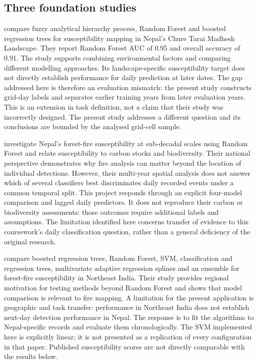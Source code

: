 \documentclass[conference,a4paper]{IEEEtran}
\begin{document}
\subsection{Three foundation studies}
\citet{dhakal} compare fuzzy analytical hierarchy process, Random Forest and boosted regression trees for susceptibility mapping in Nepal's Chure Tarai Madhesh Landscape. They report Random Forest AUC of 0.95 and overall accuracy of 0.91. The study supports combining environmental factors and comparing different modelling approaches. Its landscape-specific susceptibility target does not directly establish performance for daily prediction at later dates. The gap addressed here is therefore an evaluation mismatch: the present study constructs grid-day labels and separates earlier training years from later evaluation years. This is an extension in task definition, not a claim that their study was incorrectly designed. The present study addresses a different question and its conclusions are bounded by the analysed grid-cell sample.

\citet{dahal} investigate Nepal's forest-fire susceptibility at sub-decadal scales using Random Forest and relate susceptibility to carbon stocks and biodiversity. Their national perspective demonstrates why fire analysis can matter beyond the location of individual detections. However, their multi-year spatial analysis does not answer which of several classifiers best discriminates daily recorded events under a common temporal split. This project responds through an explicit four-model comparison and lagged daily predictors. It does not reproduce their carbon or biodiversity assessments: those outcomes require additional labels and assumptions. The limitation identified here concerns transfer of evidence to this coursework's daily classification question, rather than a general deficiency of the original research.

\citet{sarkar} compare boosted regression trees, Random Forest, SVM, classification and regression trees, multivariate adaptive regression splines and an ensemble for forest-fire susceptibility in Northeast India. Their study provides regional motivation for testing methods beyond Random Forest and shows that model comparison is relevant to fire mapping. A limitation for the present application is geographic and task transfer: performance in Northeast India does not establish next-day detection performance in Nepal. The response is to fit the algorithms to Nepal-specific records and evaluate them chronologically. The SVM implemented here is explicitly linear; it is not presented as a replication of every configuration in that paper. Published susceptibility scores are not directly comparable with the results below.
\end{document}
